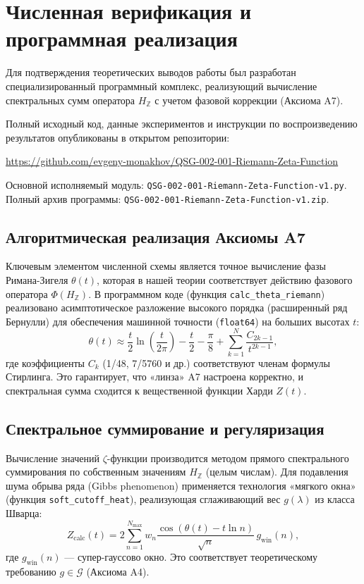 \documentclass{article}
\numberwithin{equation}{section}
\theoremstyle{plain}
\theoremstyle{definition}
\theoremstyle{remark}
\def\theta{θ}\def\Theta{Θ}\def\pi{π}\def\Pi{Π}%
\begin{document}
\clearpage


\section {Численная верификация и программная реализация}
\label{sec:numerical-verification}

Для подтверждения теоретических выводов работы был разработан специализированный программный комплекс, реализующий вычисление спектральных сумм оператора $H_{\mathbb{Z}}$ с учетом фазовой коррекции (Аксиома A7).

Полный исходный код, данные экспериментов и инструкции по воспроизведению результатов опубликованы в открытом репозитории:
\begin{center}
    \url{https://github.com/evgeny-monakhov/QSG-002-001-Riemann-Zeta-Function}
\end{center}
Основной исполняемый модуль: \texttt{QSG-002-001-Riemann-Zeta-Function-v1.py}.
Полный архив программы: \texttt{QSG-002-001-Riemann-Zeta-Function-v1.zip}.

\subsection*{Алгоритмическая реализация Аксиомы A7}
Ключевым элементом численной схемы является точное вычисление фазы Римана-Зигеля $\theta(t)$, которая в нашей теории соответствует действию фазового оператора $\Phi(H_{\mathbb{Z}})$.
В программном коде (функция \texttt{calc\_theta\_riemann}) реализовано асимптотическое разложение высокого порядка (расширенный ряд Бернулли) для обеспечения машинной точности (\texttt{float64}) на больших высотах $t$:
\begin{equation}
    \theta(t) \approx \frac{t}{2}\ln\left(\frac{t}{2\pi}\right) - \frac{t}{2} - \frac{\pi}{8} + \sum_{k=1}^{N} \frac{C_{2k-1}}{t^{2k-1}},
\end{equation}
где коэффициенты $C_k$ (1/48, 7/5760 и др.) соответствуют членам формулы Стирлинга. Это гарантирует, что «линза» A7 настроена корректно, и спектральная сумма сходится к вещественной функции Харди $Z(t)$.

\subsection*{Спектральное суммирование и регуляризация}
Вычисление значений $\zeta$-функции производится методом прямого спектрального суммирования по собственным значениям $H_{\mathbb{Z}}$ (целым числам).
Для подавления шума обрыва ряда (Gibbs phenomenon) применяется технология «мягкого окна» (функция \texttt{soft\_cutoff\_heat}), реализующая сглаживающий вес $g(\lambda)$ из класса Шварца:
\begin{equation}
    Z_{\text{calc}}(t) = 2 \sum_{n=1}^{N_{\text{max}}} w_n \frac{\cos(\theta(t) - t \ln n)}{\sqrt{n}} \, g_{\text{win}}(n),
\end{equation}
где $g_{\text{win}}(n)$ — супер-гауссово окно. Это соответствует теоретическому требованию $g \in \mathcal{G}$ (Аксиома A4).
\end{document}

